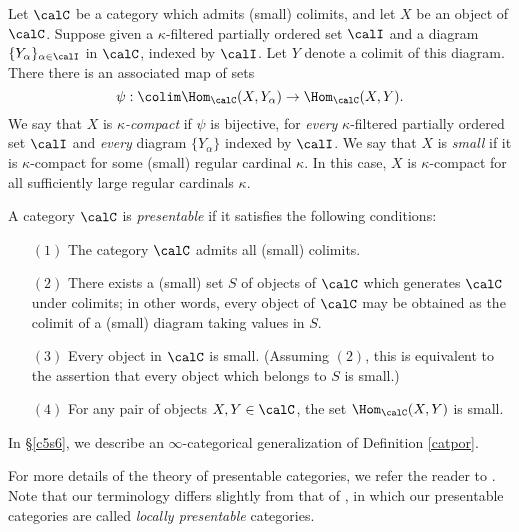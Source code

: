 \begin{CategoryTheory}
Let $\calC$ be a category which admits (small) colimits, and 
let $X$ be an object of $\calC$.
Suppose given a $\kappa$-filtered partially ordered set $\calI$ and a diagram $\{Y_{\alpha} \}_{\alpha \in \calI}$ in $\calC$, indexed by $\calI$. Let $Y$ denote a colimit of this diagram.
There there is an associated map of sets
$$ \psi: \colim \Hom_{\calC}(X, Y_{\alpha}) \rightarrow \Hom_{\calC}(X,Y).$$
We say that $X$ is {\it $\kappa$-compact} if $\psi$ is bijective, for {\em every} $\kappa$-filtered
partially ordered set $\calI$ and {\em every} diagram $\{ Y_{\alpha} \}$ indexed by $\calI$.
We say that $X$ is {\it small} if it is $\kappa$-compact for some (small) regular cardinal $\kappa$.
In this case, $X$ is $\kappa$-compact for all sufficiently large regular cardinals $\kappa$.

\begin{definition}\label{catpor}
A category $\calC$ is {\it presentable} if it satisfies the following conditions:
\begin{itemize}
\item[$(1)$] The category $\calC$ admits all (small) colimits.

\item[$(2)$] There exists a (small) set $S$ of objects of $\calC$ which generates
$\calC$ under colimits; in other words, every object of $\calC$ may be obtained as the colimit of a (small) diagram taking values in $S$.

\item[$(3)$] Every object in $\calC$ is small. (Assuming $(2)$, this is equivalent to the assertion
that every object which belongs to $S$ is small.)

\item[$(4)$] For any pair of objects $X,Y \in \calC$, the set $\Hom_{\calC}(X,Y)$ is small.
\end{itemize}
\end{definition}

\begin{remark}
In \S \ref{c5s6}, we describe an $\infty$-categorical generalization of Definition \ref{catpor}.
\end{remark}

\begin{remark}
For more details of the theory of presentable categories, we refer the reader to \cite{adamek}. Note that our terminology differs slightly from that of \cite{adamek}, in which our presentable categories are called {\it locally presentable} categories.
\end{remark}


\end{CategoryTheory}
